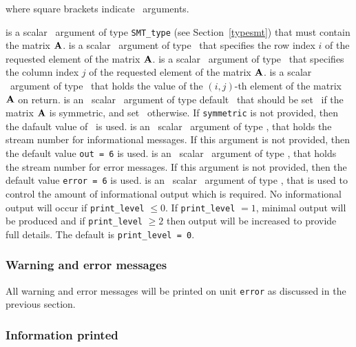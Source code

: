 \documentclass{galahad}
\begin{document}
\vspace*{1mm}
\noindent where square brackets indicate \optional\ arguments. 
\vspace*{0mm}
\begin{description}
   is a scalar \intentin\ argument of type {\tt SMT\_type} (see
     Section~\ref{typesmt}) that must contain the matrix ${\mathbf{A}}$.
   is a scalar \intentin\ argument of type \integer\ that
     specifies the row index $i$ of the requested element of the
     matrix ${\mathbf{A}}$.
   is a scalar \intentin\ argument of type \integer\ that
     specifies the column index $j$ of the requested element of the
     matrix ${\mathbf{A}}$.
   is a scalar \intentout\ argument of type \realdp\ that
     holds the value of the $(i,j)$-th element of the matrix ${\mathbf{A}}$ on return.
   is an \optional\ scalar \intentin\ argument of type default
     \logical\ that should be set \true\ if the matrix ${\mathbf{A}}$ is
     symmetric, and set \false\ otherwise.  If {\tt symmetric} is not
     provided, then the dafault value of \false\ is used. 
   is an \optional\ scalar \intentin\ argument of type \integer, that holds the
     stream number for informational messages. If this argument is not
     provided, then the default value {\tt out = 6} is used.
   is an \optional\ scalar \intentin\ argument of type \integer, that holds the
     stream number for error messages. If this argument is not
     provided, then the default value {\tt error = 6} is used.
   is an \optional\ scalar \intentin\ argument of type \integer, that is used
     to control the amount of informational output which is required. No 
     informational output will occur if {\tt print\_level} $\leq 0$. If 
     {\tt print\_level} $= 1$, minimal output will be produced and if
     {\tt print\_level} $\geq 2$ then output will be
     increased to provide full details.
     The default is {\tt print\_level = 0}.
\end{description}

\subsubsection{Warning and error messages}\label{getval-error}

All warning and error messages will be printed on unit {\tt error} as
discussed in the previous section.

\subsubsection{Information printed}\label{getval-info}
\end{document}
